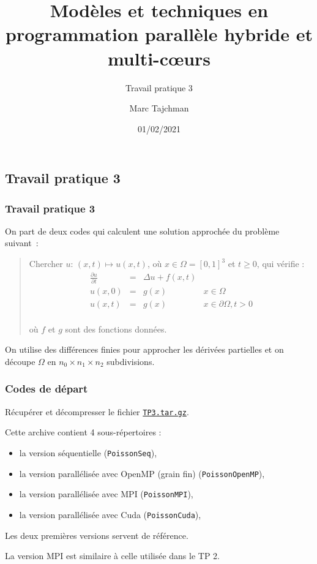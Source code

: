 \documentclass{beamer}
\title{Modèles et techniques en programmation parallèle hybride et multi-c\oe urs}
\subtitle{Travail pratique 3}
\author{Marc Tajchman}\institute{CEA - DEN/DM2S/STMF/LMES}
\date{01/02/2021}
\newcommand\Frac[2]{\frac{\displaystyle #1}{\displaystyle #2}}
\begin{document}
\begin{frame}
	\titlepage
\end{frame}

\large
\begin{frame}
	\section{Travail pratique 3}
	\frametitle{Travail pratique 3}

On part de deux codes qui calculent une solution approchée du problème suivant~:

\medskip
\begin{quote}
Chercher $u$:  $(x, t) \mapsto u(x, t)$, où  $x \in \Omega = [0,1]^3$ et $t \geq 0$, qui vérifie :
$$
\begin{array}{lcll}
\Frac{\partial u}{\partial t} & = & \Delta u + f(x, t) & \\[0.3cm]
u(x, 0) &=& g(x) & x\in \Omega \\[0.3cm]
u(x, t) & = & g(x) & x\in\partial \Omega, t > 0\\[0.3cm]
\end{array}
$$

\vspace{-0.6cm}
où $f$ et $g$ sont des fonctions données.
\end{quote}

On utilise des différences finies pour approcher les dérivées partielles et on découpe $\Omega$ en $n_0\times n_1\times n_2$ subdivisions.

\end{frame}

\begin{frame}
	\frametitle{Codes de départ}
		
	Récupérer et décompresser le fichier \href{https://perso.ensta-paris.fr/~tajchman/Seance9/TP3.tar.gz}{\tt TP3.tar.gz}.

	\medskip

    Cette archive contient 4 sous-répertoires : 
    \begin{itemize}
    	\item la version séquentielle (\texttt{PoissonSeq}),
    	\item la version parallélisée avec OpenMP (grain fin) (\texttt{PoissonOpenMP}),
    	\item la version parallélisée avec MPI (\texttt{PoissonMPI}),
    	\item la version parallélisée avec Cuda (\texttt{PoissonCuda}),
    	
    \end{itemize}

	\medskip
   Les deux premières versions servent de référence.
   
   La version MPI est similaire à celle utilisée dans le TP 2.
   \vfill
\end{frame}
\end{document}
